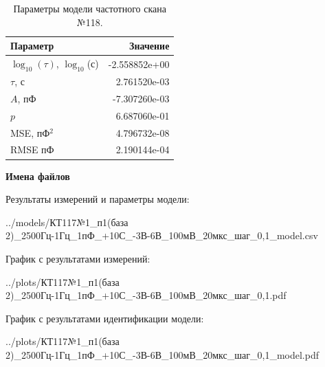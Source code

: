 \begin{table}[!ht]
    \centering
    \caption{Параметры модели частотного скана №118.}
    \begin{tabular}{|l|r|}
        \hline
        Параметр                                       & Значение                  \\ \hline
        $\log_{10}(\tau)$, $\log_{10}$(с)              & -2.558852e+00             \\ \hline
        $\tau$, с                                      & 2.761520e-03              \\ \hline
        $A$, пФ                                        & -7.307260e-03             \\ \hline
        $p$                                            & 6.687060e-01              \\ \hline
        MSE, пФ$^2$                                    & 4.796732e-08              \\ \hline
        RMSE пФ                                        & 2.190144e-04              \\ \hline
    \end{tabular}
    \label{table:frequency_scan_model_118}
\end{table}

\textbf{Имена файлов}

Результаты измерений и параметры модели:

\scriptsize../models/КТ117№1\_п1(база 2)\_2500Гц-1Гц\_1пФ\_+10С\_-3В-6В\_100мВ\_20мкс\_шаг\_0,1\_model.csv
\normalsize

График с результатами измерений:

\scriptsize../plots/КТ117№1\_п1(база 2)\_2500Гц-1Гц\_1пФ\_+10С\_-3В-6В\_100мВ\_20мкс\_шаг\_0,1.pdf
\normalsize

График с результатами идентификации модели:

\scriptsize../plots/КТ117№1\_п1(база 2)\_2500Гц-1Гц\_1пФ\_+10С\_-3В-6В\_100мВ\_20мкс\_шаг\_0,1\_model.pdf
\normalsize


